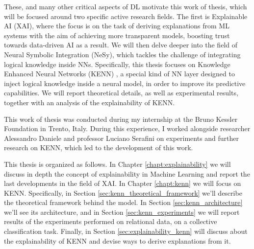 These, and many other critical aspects of DL motivate this work of thesis, which will be focused around two specific active research fields. The first is Explainable AI (XAI), where the focus is on the task of deriving explanations from ML systems with the aim of achieving more transparent models, boosting trust towards data-driven AI as a result. We will then delve deeper into the field of Neural Symbolic Integration (NeSy), which tackles the challenge of integrating logical knowledge inside NNs. Specifically, this thesis focuses on Knowledge Enhanced Neural Networks (KENN) \cite{daniele2019kenn}, a special kind of NN layer designed to inject logical knowledge inside a neural model, in order to improve its predictive capabilities. We will report theoretical details, as well as experimental results, together with an analysis of the explainability of KENN.

This work of thesis was conducted during my internship at the Bruno Kessler Foundation in Trento, Italy. During this experience, I worked alongside researcher Alessandro Daniele and professor Luciano Serafini on experiments and further research on KENN, which led to the development of this work.

This thesis is organized as follows. In Chapter \ref{chapt:explainability} we will discuss in depth the concept of explainability in Machine Learning and report the last developments in the field of XAI. In Chapter \ref{chapt:kenn} we will focus on KENN. Specifically, in Section \ref{sec:kenn_theoretical_framework} we'll describe the theoretical framework behind the model. In Section \ref{sec:kenn_architecture} we'll see its architecture, and in Section \ref{sec:kenn_experiments} we will report results of the experiments performed on relational data, on a collective classification task. Finally, in Section \ref{sec:explainability_kenn} will discuss about the explainability of KENN and devise ways to derive explanations from it.

